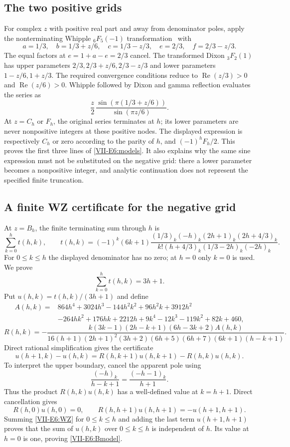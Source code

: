 \documentclass[11pt,letterpaper]{article}
\numberwithin{equation}{section}
\begin{document}
\subsection{The two positive grids}
For complex $z$ with positive real part and away from denominator
poles, apply the nonterminating Whipple ${}_6F_5(-1)$ transformation~\cite{VII-Bailey}
with
\[
 a=1/3,\quad b=1/3+z/6,\quad c=1/3-z/3,
 \quad e=2/3,\quad f=2/3-z/3.
\]
The equal factors at $e=1+a-e=2/3$ cancel. The transformed Dixon
${}_3F_2(1)$ has upper parameters
$2/3,2/3+z/6,2/3-z/3$ and lower parameters
$1-z/6,1+z/3$.
The required convergence conditions reduce to
$\operatorname{Re}(z/3)>0$ and $\operatorname{Re}(z/6)>0$.
Whipple followed by Dixon and gamma reflection evaluates the series as
\[
 \frac z2\,
 \frac{\sin(\pi(1/3+z/6))}{\sin(\pi z/6)}.
\]
At $z=C_h$ or $F_h$, the original series terminates at $h$;
its lower parameters are never nonpositive integers at these
positive nodes. The displayed expression is respectively
$C_h$ or zero according to the parity of $h$, and
$(-1)^hF_h/2$. This proves the first three lines of
\eqref{VII-E6:models}. It also explains why the same sine expression
must not be substituted on the negative grid: there a lower
parameter becomes a nonpositive integer, and analytic continuation
does not represent the specified finite truncation.

\subsection{A finite WZ certificate for the negative grid}
At $z=B_h$, the finite terminating sum through $h$ is
\[
 \sum_{k=0}^{h} t(h,k),\qquad
 t(h,k)=(-1)^k(6k+1)
 \frac{(1/3)_k(-h)_k(2h+1)_k(2h+4/3)_k}
 {k!(h+4/3)_k(1/3-2h)_k(-2h)_k}.
\]
For $0\le k\le h$ the displayed denominator has no zero;
at $h=0$ only $k=0$ is used. We prove
\begin{equation}\label{VII-E6:Bmodel}
 \sum_{k=0}^{h}t(h,k)=3h+1.
\end{equation}
Put $u(h,k)=t(h,k)/(3h+1)$ and define
\[
 \begin{split}
 A(h,k)={}&864h^4+3024h^3-144h^2k^2+96h^2k+3912h^2\\
 &-264hk^2+176hk+2212h+9k^4-12k^3-119k^2+82k+460,
 \end{split}
\]
\[
 R(h,k)=
 -\frac{k(3k-1)(2h-k+1)(6h-3k+2)A(h,k)}
 {16(h+1)(2h+1)^2(3h+2)(6h+5)(6h+7)(6k+1)(h-k+1)}.
\]
Direct rational simplification gives the certificate
\begin{equation}\label{VII-E6:WZ}
 u(h+1,k)-u(h,k)
 =R(h,k+1)u(h,k+1)-R(h,k)u(h,k).
\end{equation}
To interpret the upper boundary, cancel the apparent pole using
\[
 \frac{(-h)_k}{h-k+1}=
 \frac{(-h-1)_k}{h+1}.
\]
Thus the product $R(h,k)u(h,k)$ has a well-defined value at
$k=h+1$. Direct cancellation gives
\[
 R(h,0)u(h,0)=0,\qquad
 R(h,h+1)u(h,h+1)=-u(h+1,h+1).
\]
Summing \eqref{VII-E6:WZ} for $0\le k\le h$ and adding the last term
$u(h+1,h+1)$ proves that the sum of $u(h,k)$ over $0\le k\le h$
is independent of $h$. Its value at $h=0$ is one, proving
\eqref{VII-E6:Bmodel}.
\end{document}

